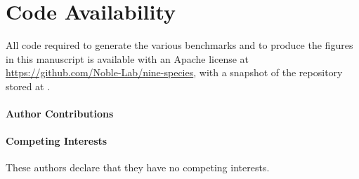 \documentclass{article}
\newcommand{\fixme}[1]{{\color{red}{\bf #1}\color{black}}}
\begin{document}
\section*{Code Availability}
All code required to generate the various benchmarks and to produce the figures in this manuscript is available with an Apache license at \url{https://github.com/Noble-Lab/nine-species}, with a snapshot of the repository stored at \fixme{zenodo}.



\paragraph{Author Contributions}

\paragraph{Competing Interests}
These authors declare that they have no competing interests.
  
\end{document}
